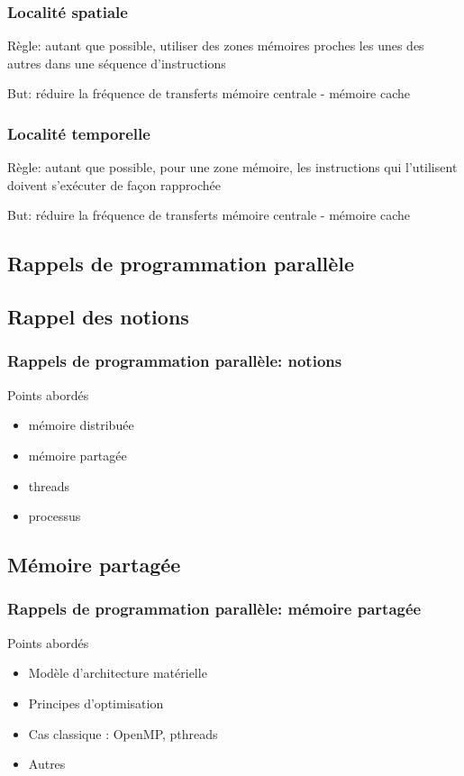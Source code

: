 \documentclass{beamer}
\begin{document}
\begin{frame}
\frametitle{Localité spatiale}
Règle: autant que possible, utiliser des zones mémoires proches les unes des autres dans une séquence d'instructions

\bigskip
But: réduire la fréquence de transferts mémoire centrale - mémoire cache
\end{frame}

\begin{frame}
\frametitle{Localité temporelle}
Règle: autant que possible, pour une zone mémoire, les instructions qui l'utilisent doivent s'exécuter de façon rapprochée

\bigskip
But: réduire la fréquence de transferts mémoire centrale - mémoire cache
\end{frame}

\begin{frame}
\section{Rappels de programmation parallèle}
\subsection{Rappel des notions}
\frametitle{Rappels de programmation parallèle: notions}
Points abordés
\begin{itemize}
\item mémoire distribuée
\item mémoire partagée
\item threads
\item processus
\end{itemize}
\end{frame}

\begin{frame}
\subsection{Mémoire partagée}
\frametitle{Rappels de programmation parallèle: mémoire partagée}
Points abordés
\begin{itemize}
\item Modèle d'architecture matérielle
\item Principes d'optimisation
\item Cas classique : OpenMP, pthreads
\item Autres
\end{itemize}
\end{frame}
\end{document}
